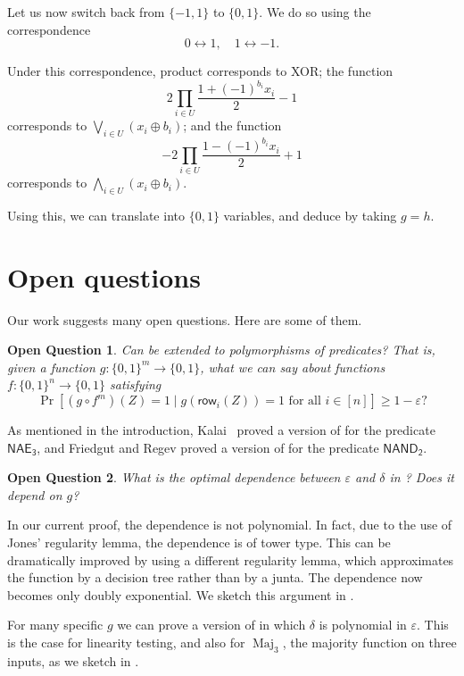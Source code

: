 \documentclass{article}
\newtheorem{open}{Open Question}
\theoremstyle{definition}
\theoremstyle{remark}
\providecommand{\row}{\mathsf{row}}
\providecommand{\biglor}{\bigvee}
\providecommand{\bigland}{\bigwedge}
\DeclareMathOperator{\Maj}{Maj}
\newcommand\eps{\varepsilon}
\renewcommand\epsilon{\eps}
\renewcommand\geq{\geqslant}
\begin{document}
Let us now switch back from $\{-1,1\}$ to $\{0,1\}$. We do so using the correspondence
\[
 0 \leftrightarrow 1, \quad 1 \leftrightarrow -1.
\]

Under this correspondence, product corresponds to XOR; the function
\[
 2 \prod_{i \in U} \frac{1 + (-1)^{b_i} x_i}{2} - 1
\]
corresponds to $\biglor_{i \in U} (x_i \oplus b_i)$; and the function
\[
 -2 \prod_{i \in U} \frac{1 - (-1)^{b_i} x_i}{2} + 1
\]
corresponds to $\bigland_{i \in U} (x_i \oplus b_i)$. 

Using this, we can translate  into $\{0,1\}$ variables, and deduce  by taking $g = h$.

\section{Open questions}
\label{sec:open-questions}

Our work suggests many open questions. Here are some of them.

\begin{open}
Can  be extended to polymorphisms of predicates? That is, given a function $g\colon \{0,1\}^m \to \{0,1\}$, what we can say about functions $f\colon \{0,1\}^n \to \{0,1\}$ satisfying
\[
 \Pr[(g \circ f^m)(Z) = 1 \mid g(\row_i(Z)) = 1 \text{ for all } i \in [n]] \geq 1 - \epsilon?
\]
\end{open}

As mentioned in the introduction, Kalai~\cite{Kalai} proved a version of  for the predicate $\mathsf{NAE_3}$, and Friedgut and Regev proved a version of  for the predicate $\mathsf{NAND_2}$.

\begin{open}
What is the optimal dependence between $\epsilon$ and $\delta$ in ? Does it depend on $g$?
\end{open}

In our current proof, the dependence is not polynomial. In fact, due to the use of Jones' regularity lemma, the dependence is of tower type. This can be dramatically improved by using a different regularity lemma, which approximates the function by a decision tree rather than by a junta. The dependence now becomes only doubly exponential. We sketch this argument in .

For many specific $g$ we can prove a version of  in which $\delta$ is polynomial in $\epsilon$. This is the case for linearity testing, and also for $\Maj_3$, the majority function on three inputs, as we sketch in .
\end{document}
